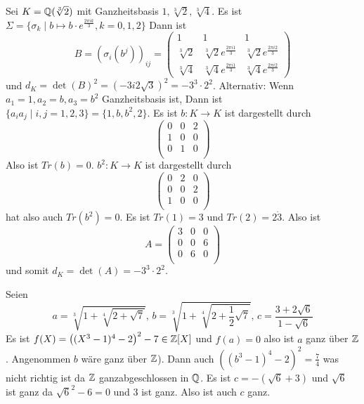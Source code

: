 \begin{Bsp}
    Sei \(K=\mathbb{Q}(\sqrt[3]{2})\) mit Ganzheitsbasis \(1,\sqrt[3]{2},\sqrt[3]{4}\).
    Es ist \(\Sigma=\{\sigma_k\mid b\mapsto b\cdot e^{\frac{2\pi i k}{3}}, k=0,1,2\}\)
    Dann ist 
    \[B=(\sigma_i(b^j))_{ij}=\begin{pmatrix}
        1 & 1 & 1\\
        \sqrt[3]{2} & \sqrt[3]{2}e^{\frac{2\pi i 1}{3}} & \sqrt[3]{2}e^{\frac{2\pi i 2}{3}}\\
        \sqrt[3]{4} & \sqrt[3]{4}e^{\frac{2\pi i 1}{3}} & \sqrt[3]{4}e^{\frac{2\pi i 2}{3}}
    \end{pmatrix}\]
    und \(d_K=\det(B)^2=(-3i2\sqrt{3})^2=-3^3\cdot 2^2\).
    Alternativ:
    Wenn \(a_1=1, a_2=b, a_3=b^2\) Ganzheitsbasis ist,
    Dann ist \(\{a_ia_j\mid i,j=1,2,3\}=\{1,b,b^2,2\}\).
    Es ist \(b\colon K\to K\) ist dargestellt durch 
    \[\begin{pmatrix}
       0 & 0& 2\\
       1 & 0 & 0\\
       0 & 1& 0\\
    \end{pmatrix}\] Also ist \(Tr(b)=0\).
    \(b^2\colon K\to K\) ist dargestellt durch \[\begin{pmatrix}
       0 & 2& 0\\
       0 & 0 & 2\\
       1 & 0& 0\\
    \end{pmatrix}\] hat also auch \(Tr(b^2)=0\).
    Es ist \(Tr(1)=3\) und \(Tr(2)=2\dot 3\).
    Also ist \[A=
        \begin{pmatrix}
       3 & 0& 0\\
       0 & 0 & 6\\
       0 & 6 & 0\\
    \end{pmatrix}\] 
    und somit \(d_K=\det(A)=-3^3\cdot 2^2\).
\end{Bsp}
\begin{Bsp}
    Seien \[a=\sqrt[3]{1+\sqrt[4]{2+\sqrt{7}}},\, b=\sqrt[3]{1+\sqrt[4]{2+\frac 1 2\sqrt{7}}},\,
    c=\dfrac{3+2\sqrt{6}}{1-\sqrt{6}}\] 
    Es ist \(f(X)=\left((X^3-1)^4-2\right)^2-7\in \mathbb{Z}[X]\) und \(f(a)=0\) 
    also ist \(a\) ganz über \(\mathbb{Z}\).
    Angenommen \(b\) wäre ganz über \(\mathbb{Z}\)).
    Dann auch \(\left((b^3-1)^4-2\right)^2=\frac 7 4\) was nicht richtig ist da \(\mathbb{Z}\) ganzabgeschlossen in \(\mathbb{Q}\).
    Es ist \(c=-(\sqrt{6}+3)\) und \(\sqrt{6}\) ist ganz da \(\sqrt{6}^2-6=0\) und \(3\) ist ganz.
    Also ist auch \(c\) ganz.
\end{Bsp}

